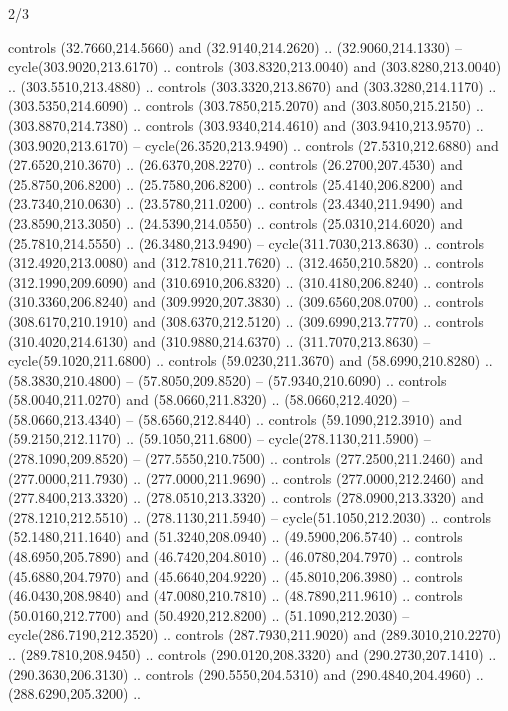 \begin{flagdescription}{2/3}
\begin{scope}[xshift=0.5\flaglength,yshift=0.5\flagwidth,scale=\stretchfactor]
\begin{scope}[scale=0.001645\flagwidth,yshift=65mm,xshift=-63mm]
\begin{scope}[y=0.80pt, x=0.80pt, yscale=-1,]
\begin{scope}[cm={{1.33333,0.0,0.0,1.33333,(0.0,1e-05)}}]
  controls (32.7660,214.5660) and (32.9140,214.2620) .. (32.9060,214.1330) --
  cycle(303.9020,213.6170) .. controls (303.8320,213.0040) and
  (303.8280,213.0040) .. (303.5510,213.4880) .. controls (303.3320,213.8670) and
  (303.3280,214.1170) .. (303.5350,214.6090) .. controls (303.7850,215.2070) and
  (303.8050,215.2150) .. (303.8870,214.7380) .. controls (303.9340,214.4610) and
  (303.9410,213.9570) .. (303.9020,213.6170) -- cycle(26.3520,213.9490) ..
  controls (27.5310,212.6880) and (27.6520,210.3670) .. (26.6370,208.2270) ..
  controls (26.2700,207.4530) and (25.8750,206.8200) .. (25.7580,206.8200) ..
  controls (25.4140,206.8200) and (23.7340,210.0630) .. (23.5780,211.0200) ..
  controls (23.4340,211.9490) and (23.8590,213.3050) .. (24.5390,214.0550) ..
  controls (25.0310,214.6020) and (25.7810,214.5550) .. (26.3480,213.9490) --
  cycle(311.7030,213.8630) .. controls (312.4920,213.0080) and
  (312.7810,211.7620) .. (312.4650,210.5820) .. controls (312.1990,209.6090) and
  (310.6910,206.8320) .. (310.4180,206.8240) .. controls (310.3360,206.8240) and
  (309.9920,207.3830) .. (309.6560,208.0700) .. controls (308.6170,210.1910) and
  (308.6370,212.5120) .. (309.6990,213.7770) .. controls (310.4020,214.6130) and
  (310.9880,214.6370) .. (311.7070,213.8630) -- cycle(59.1020,211.6800) ..
  controls (59.0230,211.3670) and (58.6990,210.8280) .. (58.3830,210.4800) --
  (57.8050,209.8520) -- (57.9340,210.6090) .. controls (58.0040,211.0270) and
  (58.0660,211.8320) .. (58.0660,212.4020) -- (58.0660,213.4340) --
  (58.6560,212.8440) .. controls (59.1090,212.3910) and (59.2150,212.1170) ..
  (59.1050,211.6800) -- cycle(278.1130,211.5900) -- (278.1090,209.8520) --
  (277.5550,210.7500) .. controls (277.2500,211.2460) and (277.0000,211.7930) ..
  (277.0000,211.9690) .. controls (277.0000,212.2460) and (277.8400,213.3320) ..
  (278.0510,213.3320) .. controls (278.0900,213.3320) and (278.1210,212.5510) ..
  (278.1130,211.5940) -- cycle(51.1050,212.2030) .. controls (52.1480,211.1640)
  and (51.3240,208.0940) .. (49.5900,206.5740) .. controls (48.6950,205.7890)
  and (46.7420,204.8010) .. (46.0780,204.7970) .. controls (45.6880,204.7970)
  and (45.6640,204.9220) .. (45.8010,206.3980) .. controls (46.0430,208.9840)
  and (47.0080,210.7810) .. (48.7890,211.9610) .. controls (50.0160,212.7700)
  and (50.4920,212.8200) .. (51.1090,212.2030) -- cycle(286.7190,212.3520) ..
  controls (287.7930,211.9020) and (289.3010,210.2270) .. (289.7810,208.9450) ..
  controls (290.0120,208.3320) and (290.2730,207.1410) .. (290.3630,206.3130) ..
  controls (290.5550,204.5310) and (290.4840,204.4960) .. (288.6290,205.3200) ..

\end{scope}
\end{scope}
\end{scope}
\end{scope}
\end{flagdescription}
